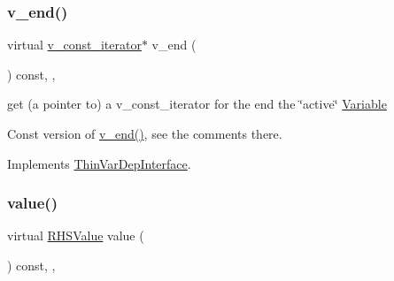 \subsubsection{\texorpdfstring{v\+\_\+end()}{v\_end()}\hspace{0.1cm}{\footnotesize\ttfamily [2/2]}}
{\footnotesize\ttfamily virtual \mbox{\hyperlink{class_s_m_spp__di__unipi__it_1_1_thin_var_dep_interface_1_1v__const__iterator}{v\+\_\+const\+\_\+iterator}}$\ast$ v\+\_\+end (\begin{DoxyParamCaption}\item[{void}]{ }\end{DoxyParamCaption}) const\hspace{0.3cm}{\ttfamily [inline]}, {\ttfamily [override]}, {\ttfamily [virtual]}}



get (a pointer to) a v\+\_\+const\+\_\+iterator for the end the \char`\"{}active\char`\"{} \mbox{\hyperlink{class_s_m_spp__di__unipi__it_1_1_variable}{Variable}} 

Const version of \mbox{\hyperlink{class_s_m_spp__di__unipi__it_1_1_f_row_constraint_ad17303c6335cb94a9d32f1fce77501fd}{v\+\_\+end()}}, see the comments there. 

Implements \mbox{\hyperlink{group___thin_var_dep_interface___c_l_a_s_s_e_s_ga6c504e866663eb64b230179f81370af4}{Thin\+Var\+Dep\+Interface}}.

\mbox{\label{class_s_m_spp__di__unipi__it_1_1_f_row_constraint_ad9256be16b98f3b557f54fa5e2118db7}} 
\subsubsection{\texorpdfstring{value()}{value()}}
{\footnotesize\ttfamily virtual \mbox{\hyperlink{class_s_m_spp__di__unipi__it_1_1_row_constraint_a8813536ab3b13a81c8e83a999ade3bd8}{R\+H\+S\+Value}} value (\begin{DoxyParamCaption}\item[{void}]{ }\end{DoxyParamCaption}) const\hspace{0.3cm}{\ttfamily [inline]}, {\ttfamily [override]}, {\ttfamily [virtual]}}



